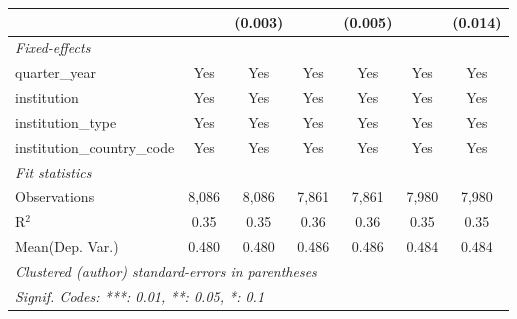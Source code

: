 \begin{tabular}{lcccccc}
                                      &              & (0.003)      &               & (0.005)      &              & (0.014)\\   
   \midrule
   \emph{Fixed-effects}\\
   quarter\_year                      & Yes          & Yes          & Yes           & Yes          & Yes          & Yes\\  
   institution                        & Yes          & Yes          & Yes           & Yes          & Yes          & Yes\\  
   institution\_type                  & Yes          & Yes          & Yes           & Yes          & Yes          & Yes\\  
   institution\_country\_code         & Yes          & Yes          & Yes           & Yes          & Yes          & Yes\\  
   \midrule
   \emph{Fit statistics}\\
   Observations                       & 8,086        & 8,086        & 7,861         & 7,861        & 7,980        & 7,980\\  
   R$^2$                              & 0.35         & 0.35         & 0.36          & 0.36         & 0.35         & 0.35\\  
Mean(Dep. Var.) & 0.480 & 0.480 & 0.486 & 0.486 & 0.484 & 0.484 \\
   \midrule \midrule
   \multicolumn{7}{l}{\emph{Clustered (author) standard-errors in parentheses}}\\
   \multicolumn{7}{l}{\emph{Signif. Codes: ***: 0.01, **: 0.05, *: 0.1}}\\
\end{tabular}
\par\endgroup
